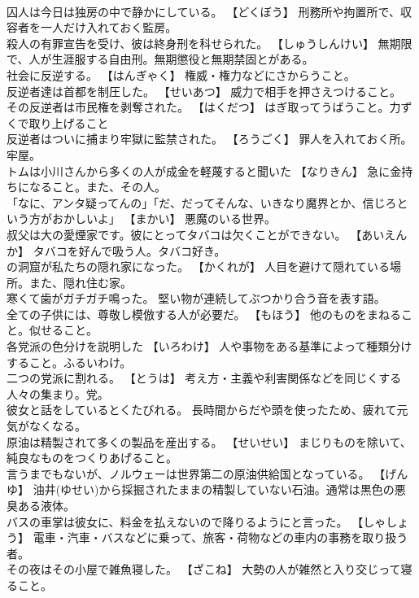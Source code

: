 \documentclass[8pt]{extreport}
\begin{document}
\begin{CJK}{UTF8}{min}
\\	囚人は今日は独房の中で静かにしている。	【どくぼう】 刑務所や拘置所で、収容者を一人だけ入れておく監房。
\\	殺人の有罪宣告を受け、彼は終身刑を科せられた。	【しゅうしんけい】 無期限で、人が生涯服する自由刑。無期懲役と無期禁固とがある。
\\	社会に反逆する。	【はんぎゃく】 権威・権力などにさからうこと。
\\	反逆者達は首都を制圧した。	【せいあつ】 威力で相手を押さえつけること。
\\	その反逆者は市民権を剥奪された。	【はくだつ】 はぎ取ってうばうこと。力ずくで取り上げること
\\	反逆者はついに捕まり牢獄に監禁された。	【ろうごく】 罪人を入れておく所。牢屋。
\\	トムは小川さんから多くの人が成金を軽蔑すると聞いた	【なりきん】 急に金持ちになること。また、その人。
\\	「なに、アンタ疑ってんの」「だ、だってそんな、いきなり魔界とか、信じろという方がおかしいよ」	【まかい】 悪魔のいる世界。
\\	叔父は大の愛煙家です。彼にとってタバコは欠くことができない。	【あいえんか】 タバコを好んで吸う人。タバコ好き。
\\	の洞窟が私たちの隠れ家になった。	【かくれが】 人目を避けて隠れている場所。また、隠れ住む家。
\\	寒くて歯がガチガチ鳴った。	堅い物が連続してぶつかり合う音を表す語。
\\	全ての子供には、尊敬し模倣する人が必要だ。	【もほう】 他のものをまねること。似せること。
\\	各党派の色分けを説明した	【いろわけ】 人や事物をある基準によって種類分けすること。ふるいわけ。
\\	二つの党派に割れる。	【とうは】 考え方・主義や利害関係などを同じくする人々の集まり。党。
\\	彼女と話をしているとくたびれる。	長時間からだや頭を使ったため、疲れて元気がなくなる。
\\	原油は精製されて多くの製品を産出する。	【せいせい】 まじりものを除いて、純良なものをつくりあげること。
\\	言うまでもないが、ノルウェーは世界第二の原油供給国となっている。	【げんゆ】 油井(ゆせい)から採掘されたままの精製していない石油。通常は黒色の悪臭ある液体。
\\	バスの車掌は彼女に、料金を払えないので降りるようにと言った。	【しゃしょう】 電車・汽車・バスなどに乗って、旅客・荷物などの車内の事務を取り扱う者。
\\	その夜はその小屋で雑魚寝した。	【ざこね】 大勢の人が雑然と入り交じって寝ること。

\end{CJK}
\end{document}
